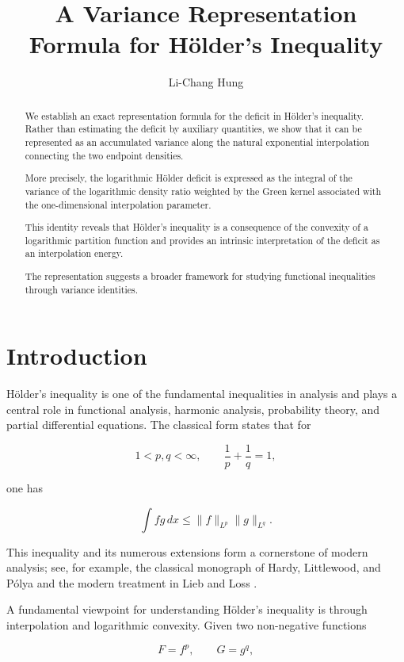 \documentclass[11pt]{amsart}
\title[
A Variance Representation Formula for Hölder's Inequality
]
{
A Variance Representation Formula for Hölder's Inequality
}
\author{Li-Chang Hung}
\begin{document}
\maketitle


\begin{abstract}

We establish an exact representation formula for the deficit
in Hölder's inequality. 
Rather than estimating the deficit by auxiliary quantities,
we show that it can be represented as an accumulated variance
along the natural exponential interpolation connecting the two
endpoint densities.

More precisely, the logarithmic Hölder deficit is expressed as
the integral of the variance of the logarithmic density ratio
weighted by the Green kernel associated with the one-dimensional
interpolation parameter.

This identity reveals that Hölder's inequality is a consequence
of the convexity of a logarithmic partition function and provides
an intrinsic interpretation of the deficit as an interpolation
energy.

The representation suggests a broader framework for studying
functional inequalities through variance identities.

\end{abstract}


\section{Introduction}


Hölder's inequality is one of the fundamental inequalities in
analysis and plays a central role in functional analysis, harmonic
analysis, probability theory, and partial differential equations.
The classical form states that for

\[
1<p,q<\infty,
\qquad
\frac1p+\frac1q=1 ,
\]

one has

\[
\int fg\,dx
\leq
\|f\|_{L^p}
\|g\|_{L^q}.
\]

This inequality and its numerous extensions form a cornerstone of
modern analysis; see, for example, the classical monograph of
Hardy, Littlewood, and Pólya \cite{Hardy1952} and the modern
treatment in Lieb and Loss \cite{LiebLoss2001}.


A fundamental viewpoint for understanding Hölder's inequality is
through interpolation and logarithmic convexity. Given two
non-negative functions

\[
F=f^p,
\qquad
G=g^q ,
\]
\end{document}
